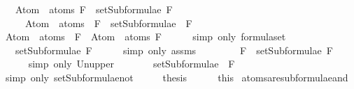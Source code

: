 \begin{isabellebody}
\ \ \ {\isachardoublequoteopen}Atom\ {\isacharbackquote}\ atoms\ F\ {\isasymsubseteq}\ setSubformulae\ F{\isachardoublequoteclose}\ \isanewline
\ \ \ \ \ {\isachardoublequoteopen}Atom\ {\isacharbackquote}\ atoms\ {\isacharparenleft}\isactrlbold {\isasymnot}\ F{\isacharparenright}\ {\isasymsubseteq}\ setSubformulae\ {\isacharparenleft}\isactrlbold {\isasymnot}\ F{\isacharparenright}{\isachardoublequoteclose}\isanewline
%
\isadelimproof
%
\endisadelimproof
%
\isatagproof
{}\isamarkupfalse%
\ {\isacharminus}\isanewline
\ \ \isamarkupfalse%
\ {\isachardoublequoteopen}Atom\ {\isacharbackquote}\ atoms\ {\isacharparenleft}\isactrlbold {\isasymnot}\ F{\isacharparenright}\ {\isacharequal}\ Atom\ {\isacharbackquote}\ atoms\ F{\isachardoublequoteclose}\isanewline
\ \ \ \ \isamarkupfalse%
\ {\isacharparenleft}simp\ only{\isacharcolon}\ formula{\isachardot}set{\isacharparenleft}{}{\isacharparenright}{\isacharparenright}\isanewline
\ \ \isamarkupfalse%
\ \isamarkupfalse%
\ {\isachardoublequoteopen}{\isasymdots}\ {\isasymsubseteq}\ setSubformulae\ F{\isachardoublequoteclose}\isanewline
\ \ \ \ \isamarkupfalse%
\ {\isacharparenleft}simp\ only{\isacharcolon}\ assms{\isacharparenright}\isanewline
\ \ \isamarkupfalse%
\ \isamarkupfalse%
\ {\isachardoublequoteopen}{\isasymdots}\ {\isasymsubseteq}\ {\isacharbraceleft}\isactrlbold {\isasymnot}\ F{\isacharbraceright}\ {\isasymunion}\ setSubformulae\ F{\isachardoublequoteclose}\isanewline
\ \ \ \ \isamarkupfalse%
\ {\isacharparenleft}simp\ only{\isacharcolon}\ Un{\isacharunderscore}upper{}{\isacharparenright}\isanewline
\ \ \isamarkupfalse%
\ \isamarkupfalse%
\ {\isachardoublequoteopen}{\isasymdots}\ {\isacharequal}\ setSubformulae\ {\isacharparenleft}\isactrlbold {\isasymnot}\ F{\isacharparenright}{\isachardoublequoteclose}\isanewline
\ \ \ \ \isamarkupfalse%
\ {\isacharparenleft}simp\ only{\isacharcolon}\ setSubformulae{\isacharunderscore}not{\isacharparenright}\isanewline
\ \ \isamarkupfalse%
\ \isamarkupfalse%
\ {\isacharquery}thesis\isanewline
\ \ \ \ \isamarkupfalse%
\ this\isanewline
{}\isamarkupfalse%
%
\endisatagproof
{\isafoldproof}%
%
\isadelimproof
\isanewline
%
\endisadelimproof
\isanewline
{}\isamarkupfalse%
\ atoms{\isacharunderscore}are{\isacharunderscore}subformulae{\isacharunderscore}and{\isacharcolon}\ \isanewline

\end{isabellebody}
